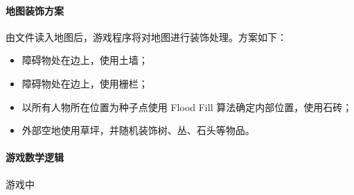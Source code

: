 \paragraph{地图装饰方案}
由文件读入地图后，游戏程序将对地图进行装饰处理。方案如下：
\begin{itemize}
	\item 障碍物处在边上，使用土墙；
	\item 障碍物处在边上，使用栅栏；
	\item 以所有人物所在位置为种子点使用 Flood Fill 算法确定内部位置，使用石砖；
	\item 外部空地使用草坪，并随机装饰树、丛、石头等物品。
\end{itemize}

\paragraph{游戏数学逻辑}
游戏中



